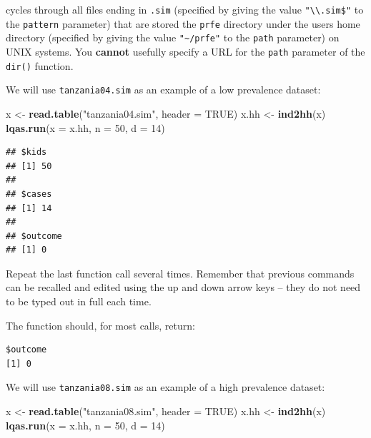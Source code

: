 \documentclass[12pt,a4paper]{book}
\newenvironment{Shaded}{\begin{snugshade}}{\end{snugshade}}
\newcommand{\DataTypeTok}[1]{\textcolor[rgb]{0.13,0.29,0.53}{#1}}
\newcommand{\DecValTok}[1]{\textcolor[rgb]{0.00,0.00,0.81}{#1}}
\newcommand{\KeywordTok}[1]{\textcolor[rgb]{0.13,0.29,0.53}{\textbf{#1}}}
\newcommand{\NormalTok}[1]{#1}
\newcommand{\OtherTok}[1]{\textcolor[rgb]{0.56,0.35,0.01}{#1}}
\newcommand{\StringTok}[1]{\textcolor[rgb]{0.31,0.60,0.02}{#1}}
\theoremstyle{definition}
\theoremstyle{definition}
\theoremstyle{definition}
\theoremstyle{remark}
\begin{document}
cycles through all files ending in \texttt{.sim} (specified by giving
the value \texttt{"\textbackslash{}\textbackslash{}.sim\$"} to the
\texttt{pattern} parameter) that are stored the \texttt{prfe} directory
under the users home directory (specified by giving the value
\texttt{"\textasciitilde{}/prfe"} to the \texttt{path} parameter) on
UNIX systems. You \textbf{cannot} usefully specify a URL for the
\texttt{path} parameter of the \texttt{dir()} function.

We will use \texttt{tanzania04.sim} as an example of a low prevalence
dataset:

\begin{Shaded}
\begin{Highlighting}[]
\NormalTok{x <-}\StringTok{ }\KeywordTok{read.table}\NormalTok{(}\StringTok{"tanzania04.sim"}\NormalTok{, }\DataTypeTok{header =} \OtherTok{TRUE}\NormalTok{)}
\NormalTok{x.hh <-}\StringTok{ }\KeywordTok{ind2hh}\NormalTok{(x)}
\KeywordTok{lqas.run}\NormalTok{(}\DataTypeTok{x =}\NormalTok{ x.hh, }\DataTypeTok{n =} \DecValTok{50}\NormalTok{, }\DataTypeTok{d =} \DecValTok{14}\NormalTok{)}
\end{Highlighting}
\end{Shaded}

\begin{verbatim}
## $kids
## [1] 50
## 
## $cases
## [1] 14
## 
## $outcome
## [1] 0
\end{verbatim}

Repeat the last function call several times. Remember that previous
commands can be recalled and edited using the up and down arrow keys --
they do not need to be typed out in full each time.

The function should, for most calls, return:

\begin{verbatim}
$outcome
[1] 0
\end{verbatim}

We will use \texttt{tanzania08.sim} as an example of a high prevalence
dataset:

\begin{Shaded}
\begin{Highlighting}[]
\NormalTok{x <-}\StringTok{ }\KeywordTok{read.table}\NormalTok{(}\StringTok{"tanzania08.sim"}\NormalTok{, }\DataTypeTok{header =} \OtherTok{TRUE}\NormalTok{)}
\NormalTok{x.hh <-}\StringTok{ }\KeywordTok{ind2hh}\NormalTok{(x)}
\KeywordTok{lqas.run}\NormalTok{(}\DataTypeTok{x =}\NormalTok{ x.hh, }\DataTypeTok{n =} \DecValTok{50}\NormalTok{, }\DataTypeTok{d =} \DecValTok{14}\NormalTok{)}
\end{Highlighting}
\end{Shaded}
\end{document}

